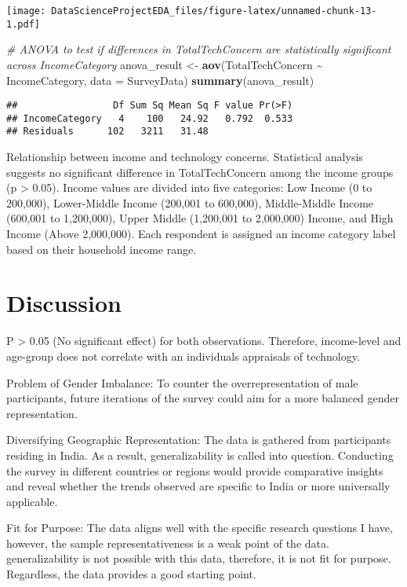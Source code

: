 \documentclass[
]{article}
\newenvironment{Shaded}{\begin{snugshade}}{\end{snugshade}}
\newcommand{\AttributeTok}[1]{\textcolor[rgb]{0.13,0.29,0.53}{#1}}
\newcommand{\CommentTok}[1]{\textcolor[rgb]{0.56,0.35,0.01}{\textit{#1}}}
\newcommand{\FunctionTok}[1]{\textcolor[rgb]{0.13,0.29,0.53}{\textbf{#1}}}
\newcommand{\NormalTok}[1]{#1}
\newcommand{\OtherTok}[1]{\textcolor[rgb]{0.56,0.35,0.01}{#1}}
\newcommand{\SpecialCharTok}[1]{\textcolor[rgb]{0.81,0.36,0.00}{\textbf{#1}}}
\begin{document}
\texttt{[image: DataScienceProjectEDA\_files/figure-latex/unnamed-chunk-13-1.pdf]}

\begin{Shaded}
\begin{Highlighting}[]
\CommentTok{\# ANOVA to test if differences in TotalTechConcern are statistically significant across IncomeCategory}
\NormalTok{anova\_result }\OtherTok{\textless{}{-}} \FunctionTok{aov}\NormalTok{(TotalTechConcern }\SpecialCharTok{\textasciitilde{}}\NormalTok{ IncomeCategory, }\AttributeTok{data =}\NormalTok{ SurveyData)}
\FunctionTok{summary}\NormalTok{(anova\_result)}
\end{Highlighting}
\end{Shaded}

\begin{verbatim}
##                 Df Sum Sq Mean Sq F value Pr(>F)
## IncomeCategory   4    100   24.92   0.792  0.533
## Residuals      102   3211   31.48
\end{verbatim}

Relationship between income and technology concerns. Statistical
analysis suggests no significant difference in TotalTechConcern among
the income groups (p \textgreater{} 0.05). Income values are divided
into five categories: Low Income (0 to 200,000), Lower-Middle Income
(200,001 to 600,000), Middle-Middle Income (600,001 to 1,200,000), Upper
Middle (1,200,001 to 2,000,000) Income, and High Income (Above
2,000,000). Each respondent is assigned an income category label based
on their household income range.

\hypertarget{discussion}{%
\section{Discussion}\label{discussion}}

P \textgreater{} 0.05 (No significant effect) for both observations.
Therefore, income-level and age-group does not correlate with an
individuals appraisals of technology.

Problem of Gender Imbalance: To counter the overrepresentation of male
participants, future iterations of the survey could aim for a more
balanced gender representation.

Diversifying Geographic Representation: The data is gathered from
participants residing in India. As a result, generalizability is called
into question. Conducting the survey in different countries or regions
would provide comparative insights and reveal whether the trends
observed are specific to India or more universally applicable.

Fit for Purpose: The data aligns well with the specific research
questions I have, however, the sample representativeness is a weak point
of the data. generalizability is not possible with this data, therefore,
it is not fit for purpose. Regardless, the data provides a good starting
point.
\end{document}
